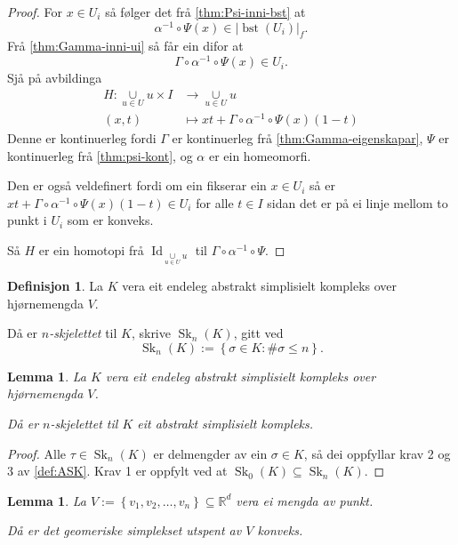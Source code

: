 \documentclass[a4paper, 12pt, norsk]{article}
\theoremstyle{plain}
\newtheorem{lemma}[theorem]{Lemma}
\theoremstyle{definition}
\newtheorem{definition}[theorem]{Definisjon}
\newcommand{\Rb}{\mathbb{R}}
\newcommand{\union}{ \mathop{\cup}\limits }
\newcommand{\gr}[1]{ \lvert #1 \rvert } %
\newcommand{\set}[1]{ \left\{ #1 \right\} } %
\newcommand{\tuple}[1]{ \left( #1 \right) } %
\DeclareMathOperator{\bst}{bst} %
\DeclareMathOperator{\Sk}{Sk} %
\DeclareMathOperator{\Id}{Id} %
\begin{document}
\begin{proof}
	For \( x \in U_i \) så følger det frå \autoref{thm:Psi-inni-bst} at
	\[
		\alpha^{-1} \circ \Psi(x) \in \gr{\bst(U_i)}_f.
	\]
	Frå \autoref{thm:Gamma-inni-ui} så får ein difor at
	\[
		\Gamma \circ \alpha^{-1} \circ \Psi(x) \in U_i.
	\]
	Sjå på avbildinga
	\begin{align*}
		H: \union_{u \in U} u \times I &\to \union_{u \in U} u \\
		\tuple{x, t} &\mapsto xt + \Gamma \circ \alpha^{-1} \circ \Psi(x)(1-t)
	\end{align*}
	Denne er kontinuerleg fordi \( \Gamma \) er kontinuerleg frå \autoref{thm:Gamma-eigenskapar}, \( \Psi \) er kontinuerleg frå \autoref{thm:psi-kont}, og \( \alpha \) er ein homeomorfi.
	
	Den er også veldefinert fordi om ein fikserar ein \( x \in U_i \) så er \( xt + \Gamma \circ \alpha^{-1} \circ \Psi(x)(1-t) \in U_i \) for alle \( t \in I \) sidan det er på ei linje mellom to punkt i \( U_i \) som er konveks.

	Så \( H \) er ein homotopi frå \( \Id_{\union_{u \in U} u} \) til \( \Gamma \circ \alpha^{-1} \circ \Psi \).
\end{proof}

\begin{definition}
	La \( K \) vera eit endeleg abstrakt simplisielt kompleks over hjørnemengda \( V \). 
	
	Då er \emph{\( n \)-skjelettet} til \( K \), skrive \( \Sk_n(K) \), gitt ved
	\[
		\Sk_n(K) := \set{\sigma \in K : \#\sigma \leq n}.
	\]
\end{definition}

\begin{lemma}
	La \( K \) vera eit endeleg abstrakt simplisielt kompleks over hjørnemengda \( V \). 
	
	Då er \( n \)-skjelettet til \( K \) eit abstrakt simplisielt kompleks.
\end{lemma}

\begin{proof}
	Alle \( \tau \in \Sk_n(K) \) er delmengder av ein \( \sigma \in K \), så dei oppfyllar krav 2 og 3 av \autoref{def:ASK}. Krav 1 er oppfylt ved at \( \Sk_0(K) \subseteq \Sk_n(K) \).
\end{proof}

\begin{lemma} \label{thm:konveks-kombinasjon-er-konveks}
	La \( V := \set{v_1, v_2, \dots, v_n} \subseteq \Rb^d \) vera ei mengda av punkt.
	
	Då er det geomeriske simplekset utspent av \( V \) konveks.
\end{lemma}
\end{document}
